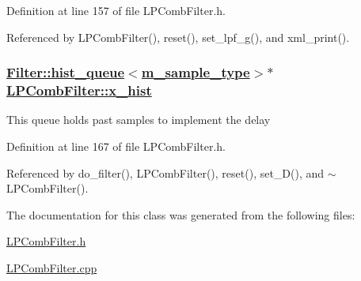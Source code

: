 Definition at line 157 of file LPComb\-Filter.h.

Referenced by LPComb\-Filter(), reset(), set\_\-lpf\_\-g(), and xml\_\-print().\hypertarget{classLPCombFilter_r4}{
\subsubsection[x\_\-hist]{\setlength{\rightskip}{0pt plus 5cm}\hyperlink{classFilter_1_1hist__queue}{Filter::hist\_\-queue}$<$\hyperlink{Types_8h_a0}{m\_\-sample\_\-type}$>$$\ast$ \hyperlink{classLPCombFilter_r4}{LPComb\-Filter::x\_\-hist}}}
\label{classLPCombFilter_r4}


This queue holds past samples to implement the delay 

Definition at line 167 of file LPComb\-Filter.h.

Referenced by do\_\-filter(), LPComb\-Filter(), reset(), set\_\-D(), and $\sim$LPComb\-Filter().

The documentation for this class was generated from the following files:\begin{CompactItemize}
\item 
\hyperlink{LPCombFilter_8h}{LPComb\-Filter.h}\item 
\hyperlink{LPCombFilter_8cpp}{LPComb\-Filter.cpp}\end{CompactItemize}
